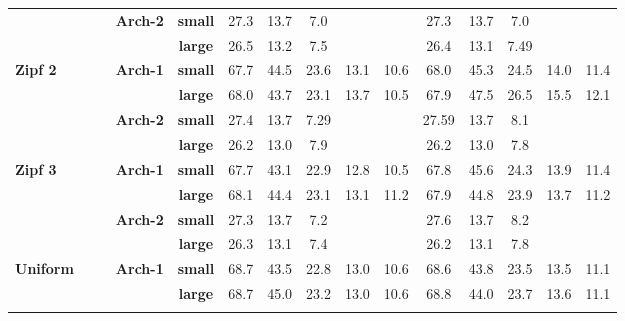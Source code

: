 \documentclass[10pt, conference, compsocconf]{IEEEtran}
\begin{document}
\begin{table}[htbp]
{\begin{tabular}{ccccc||ccccc|ccccc}
			&&&\multirow{2}{*}{\textbf{Arch-2}} & \textbf{small}  & 27.3    & 13.7   & 7.0   &        &       &  27.3    &  13.7   & 7.0   &        &       \\
			&&&& \textbf{large} &  26.5      &   13.2     &       7.5 &        &       &     26.4    &     13.1    &     7.49   &        &   \\ \hline  
			
				\multicolumn{1}{l}{\multirow{4}{*}{\textbf{Zipf 2}}}
			&&&\multirow{2}{*}{\textbf{Arch-1}} & \textbf{small}  & 67.7    & 44.5   & 23.6   & 13.1   & 10.6   & 68.0    & 45.3    & 24.5   & 14.0   & 11.4   \\
			&&&& \textbf{large} & 68.0    & 43.7   & 23.1   &   13.7 & 10.5   &  67.9 &	47.5 &	26.5	& 15.5	& 12.1 \\ \cline{2-15}
			
			&&&\multirow{2}{*}{\textbf{Arch-2}} & \textbf{small}  & 27.4    & 13.7   & 7.29   &        &       &  27.59    &  13.7   & 8.1   &        &       \\
			&&&& \textbf{large} &  26.2      &   13.0     &       7.9 &        &       &     26.2    &     13.0    &     7.8   &        &   \\ \hline 

				\multicolumn{1}{l}{\multirow{4}{*}{\textbf{Zipf 3}}}
			&&&\multirow{2}{*}{\textbf{Arch-1}} & \textbf{small}  & 67.7    & 43.1   & 22.9  & 12.8   & 10.5   & 67.8    & 45.6    & 24.3   & 13.9   & 11.4   \\
			&&&& \textbf{large} & 68.1    & 44.4   & 23.1   &   13.1 & 11.2   &  67.9 &	44.8 &	23.9	& 13.7	& 11.2 \\ \cline{2-15}
			
			&&&\multirow{2}{*}{\textbf{Arch-2}} & \textbf{small}  & 27.3    & 13.7   & 7.2   &        &       &  27.6    &  13.7   & 8.2   &        &       \\
			&&&& \textbf{large} &  26.3      &   13.1     &       7.4 &        &       &     26.2    &     13.1    &     7.8   &        &   \\ \hline 
						
			\multicolumn{1}{l}{\multirow{4}{*}{\textbf{Uniform}}}
			&&&\multirow{2}{*}{\textbf{Arch-1}} & \textbf{small}  & 68.7    & 43.5   & 22.8   & 13.0   & 10.6   & 68.6    & 43.8    & 23.5   & 13.5   & 11.1   \\
			&&&& \textbf{large} & 68.7    & 45.0   & 23.2   &   13.0 & 10.6   &  68.8 &	44.0 &	23.7	& 13.6	& 11.1 \\ \cline{2-15}
			

\end{tabular}}
\end{table}
\end{document}
